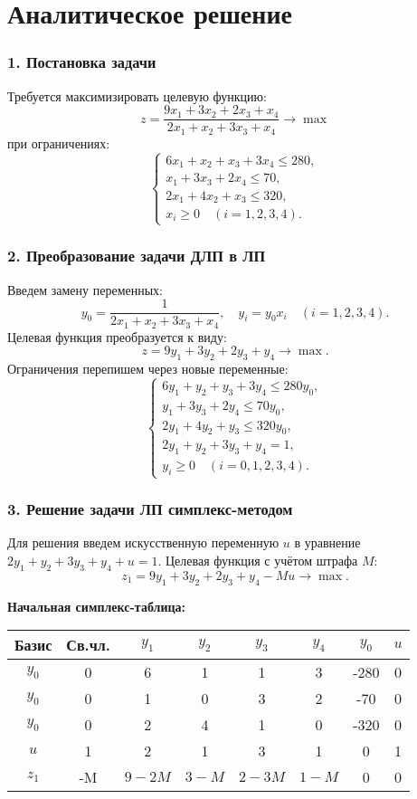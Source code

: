 \documentclass{report}
\begin{document}
	
	\newpage
	
	\chapter{Аналитическое решение}
\subsection*{1. Постановка задачи}
Требуется максимизировать целевую функцию:
\[
z = \frac{9x_1 + 3x_2 + 2x_3 + x_4}{2x_1 + x_2 + 3x_3 + x_4} \rightarrow \max
\]
при ограничениях:
\[
\begin{cases}
	6x_1 + x_2 + x_3 + 3x_4 \leq 280, \\
	x_1 + 3x_3 + 2x_4 \leq 70, \\
	2x_1 + 4x_2 + x_3 \leq 320, \\
	x_i \geq 0 \quad (i = 1, 2, 3, 4).
\end{cases}
\]

\subsection*{2. Преобразование задачи ДЛП в ЛП}
Введем замену переменных:
\[
y_0 = \frac{1}{2x_1 + x_2 + 3x_3 + x_4}, \quad y_i = y_0 x_i \quad (i = 1, 2, 3, 4).
\]
Целевая функция преобразуется к виду:
\[
z = 9y_1 + 3y_2 + 2y_3 + y_4 \rightarrow \max.
\]
Ограничения перепишем через новые переменные:
\[
\begin{cases}
	6y_1 + y_2 + y_3 + 3y_4 \leq 280y_0, \\
	y_1 + 3y_3 + 2y_4 \leq 70y_0, \\
	2y_1 + 4y_2 + y_3 \leq 320y_0, \\
	2y_1 + y_2 + 3y_3 + y_4 = 1, \\
	y_i \geq 0 \quad (i = 0, 1, 2, 3, 4).
\end{cases}
\]

\subsection*{3. Решение задачи ЛП симплекс-методом}
Для решения введем искусственную переменную $u$ в уравнение $2y_1 + y_2 + 3y_3 + y_4 + u = 1$. Целевая функция с учётом штрафа $M$:
\[
z_1 = 9y_1 + 3y_2 + 2y_3 + y_4 - M u \rightarrow \max.
\]

\begin{center}
	\textbf{Начальная симплекс-таблица:}
	\vspace{0.5cm}
	
	\begin{tabular}{|c|c|cccccc|}
		\hline
		Базис & Св.чл. & $y_1$ & $y_2$ & $y_3$ & $y_4$ & $y_0$ & $u$ \\ \hline
		$y_0$ & 0 & 6 & 1 & 1 & 3 & -280 & 0 \\
		$y_0$ & 0 & 1 & 0 & 3 & 2 & -70 & 0 \\
		$y_0$ & 0 & 2 & 4 & 1 & 0 & -320 & 0 \\
		$u$ & 1 & 2 & 1 & 3 & 1 & 0 & 1 \\ \hline
		$z_1$ & -M & $9-2M$ & $3-M$ & $2-3M$ & $1-M$ & 0 & 0 \\ \hline
	\end{tabular}
\end{center}
\end{document}

